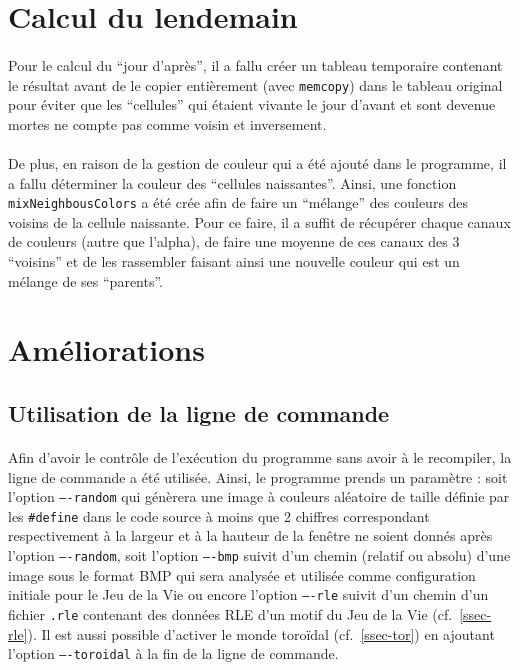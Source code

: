 \documentclass{report}
\begin{document}
\section{Calcul du lendemain}

\paragraph{} Pour le calcul du ``jour d'après'', il a fallu créer un tableau
temporaire contenant le résultat avant de le copier entièrement (avec
\lstinline[style=prog]|memcopy|) dans le tableau original pour éviter que les
``cellules'' qui étaient vivante le jour d'avant et sont devenue mortes ne
compte pas comme voisin et inversement.

\paragraph{} De plus, en raison de la gestion de couleur qui a été ajouté dans
le programme, il a fallu déterminer la couleur des ``cellules naissantes''.
Ainsi, une fonction \lstinline[style=prog]|mixNeighbousColors| a été crée afin
de faire un ``mélange'' des couleurs des voisins de la cellule naissante. Pour
ce faire, il a suffit de récupérer chaque canaux de couleurs (autre que
l'alpha), de faire une moyenne de ces canaux des 3 ``voisins'' et de les
rassembler faisant ainsi une nouvelle couleur qui est un mélange de ses
``parents''.

\section{Améliorations}

\subsection{Utilisation de la ligne de commande}

\paragraph{} Afin d'avoir le contrôle de l'exécution du programme sans avoir à
le recompiler, la ligne de commande a été utilisée. Ainsi, le programme prends
un paramètre : soit l'option \texttt{----random} qui génèrera une image à
couleurs aléatoire de taille définie par les \lstinline[style=prog]|#define|
dans le code source à moins que 2 chiffres correspondant respectivement à la
largeur et à la hauteur de la fenêtre ne soient donnés après l'option
\texttt{----random}, soit l'option \texttt{----bmp} suivit d'un chemin
(relatif ou absolu) d'une image sous le format BMP qui sera analysée et
utilisée comme configuration initiale pour le Jeu de la Vie ou encore l'option
\texttt{----rle} suivit d'un chemin d'un fichier \texttt{.rle} contenant des
données RLE d'un motif du Jeu de la Vie (cf.~\ref{ssec-rle}). Il est aussi
possible d'activer le monde toroïdal (cf.~\ref{ssec-tor}) en ajoutant l'option
\texttt{----toroidal} à la fin de la ligne de commande.
\end{document}
